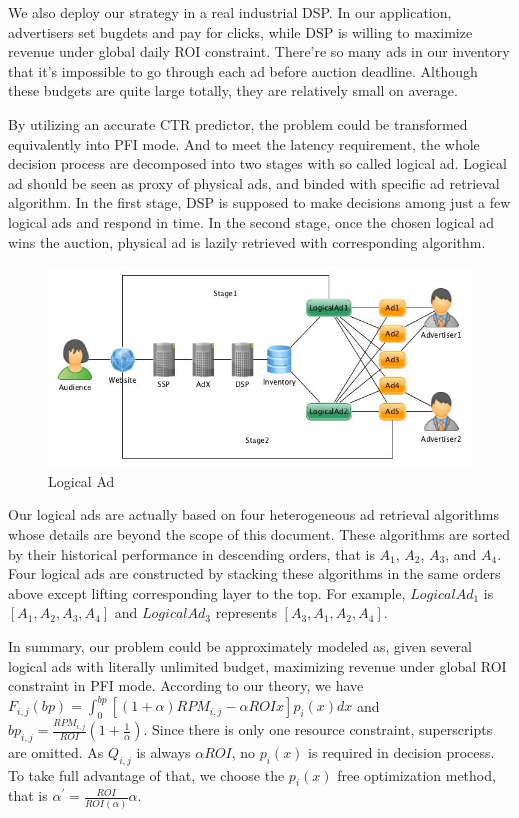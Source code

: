 \documentclass[sigconf]{acmart}
\newcommand{\sbp}{bp_{i,j}}
\newcommand{\sRPM}{RPM_{i,j}}
\newcommand{\sF}{F_{i,j}}
\newcommand{\dbbp}{\frac{\sRPM}{ROI}(1+\frac{1}{\alpha})}
\newcommand{\dbiter}{\alpha^{'} = \frac{ROI}{ROI(\alpha)}\alpha}
\begin{document}
We also deploy our strategy in a real industrial DSP.
In our application, advertisers set bugdets and pay for clicks, while DSP is willing to maximize revenue under global daily ROI constraint.
There're so many ads in our inventory that it's impossible to go through each ad before auction deadline.
Although these budgets are quite large totally, they are relatively small on average.

By utilizing an accurate CTR predictor, the problem could be transformed equivalently into PFI mode.
And to meet the latency requirement, the whole decision process are decomposed into two stages with so called logical ad.
Logical ad should be seen as proxy of physical ads, and binded with specific ad retrieval algorithm.
In the first stage, DSP is supposed to make decisions among just a few logical ads and respond in time.
In the second stage, once the chosen logical ad wins the auction, physical ad is lazily retrieved with corresponding algorithm.

\begin{figure}[!h]
\centering
\includegraphics[width=0.6\linewidth]{./LogicalAd.jpg}
\caption{Logical Ad}
\end{figure}

Our logical ads are actually based on four heterogeneous ad retrieval algorithms whose details are beyond the scope of this document.
These algorithms are sorted by their historical performance in descending orders, that is $A_1$, $A_2$, $A_3$, and $A_4$.
Four logical ads are constructed by stacking these algorithms in the same orders above except lifting corresponding layer to the top.
For example, $LogicalAd_1$ is $[A_1, A_2, A_3, A_4]$ and $LogicalAd_3$ represents $[A_3, A_1, A_2, A_4]$.

In summary, our problem could be approximately modeled as, given several logical ads with literally unlimited budget,
    maximizing revenue under global ROI constraint in PFI mode.
According to our theory, we have $\sF(bp) = \int_0^{bp} [(1+\alpha)\sRPM - \alpha{}ROIx]p_i(x)dx$
    and $\sbp=\dbbp$.
Since there is only one resource constraint, superscripts are omitted.
As $Q_{i,j}$ is always $\alpha{}ROI$, no $p_i(x)$ is required in decision process.
To take full advantage of that, we choose the $p_i(x)$ free optimization method,
    that is $\dbiter$.
\end{document}
